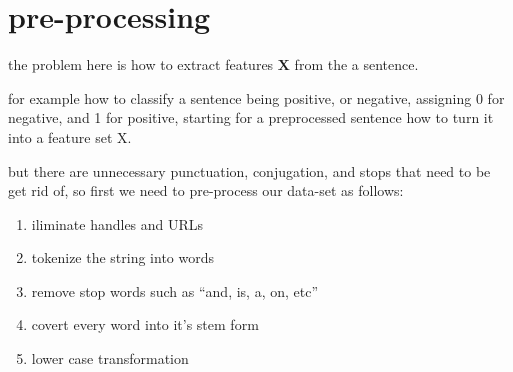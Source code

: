 \documentclass[4apaper,12pt]{book}
\begin{document}
  \section{pre-processing}
  \begin{description}
  \item the problem here is how to extract features $\mathbf{X}$ from the a sentence.
  \item for example how to classify a sentence being positive, or negative, assigning 0 for negative, and 1 for positive, starting for a preprocessed sentence how to turn it into a feature set X.
  \item but there are unnecessary punctuation, conjugation, and stops that need to be get rid of, so first we need to pre-process our data-set as follows:
    \begin{enumerate}
    \item iliminate handles and URLs
    \item tokenize the string into words
    \item remove stop words such as ``and, is, a, on, etc''
    \item covert every word into it's stem form
    \item lower case transformation
    \end{enumerate}

  \end{description}
\end{document}
